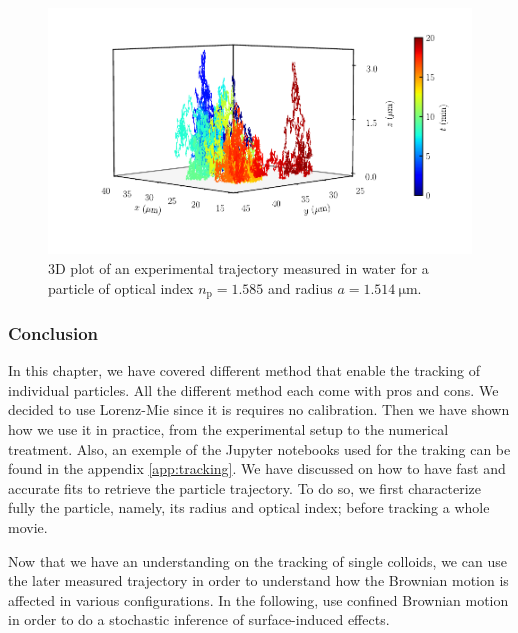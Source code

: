 \begin{figure}[H]
	\centering
	\includegraphics{02_body/chapter2/images/trajectory/traj.pdf}
	\caption{3D plot of an experimental trajectory measured in water for a particle of optical index $n_\mathrm{p} = 1.585$ and radius $a = 1.514  ~ \mathrm{\mu m}$.}
	\label{fig:3dtrajec}
\end{figure}

\subsubsection{Conclusion}

In this chapter, we have covered different method that enable the tracking of individual particles. All the different method each come with pros and cons. We decided to use Lorenz-Mie since it is requires no calibration. Then we have shown how we use it in practice, from the experimental setup to the numerical treatment. Also, an exemple of the Jupyter notebooks used for the traking can be found in the appendix \ref{app:tracking}.  We have discussed on how to have fast and accurate fits to retrieve the particle trajectory. To do so, we first characterize fully the particle, namely, its radius and optical index; before tracking a whole movie. 

Now that we have an understanding on the tracking of single colloids, we can use the later measured trajectory in order to understand how the Brownian motion is affected in various configurations. In the following, use confined Brownian motion in order to do a stochastic inference of surface-induced effects.
